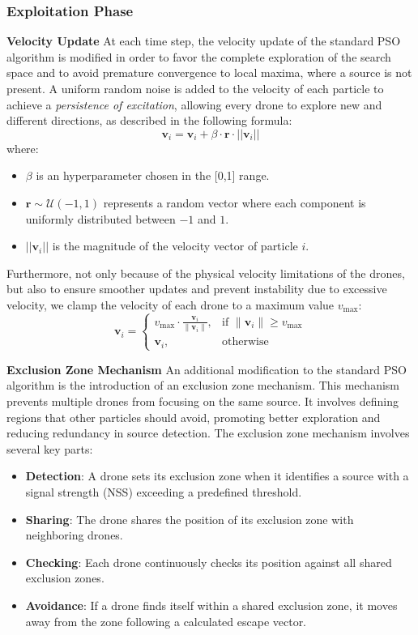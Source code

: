 \subsubsection{Exploitation Phase}
\textbf{Velocity Update}
At each time step, the velocity update of the standard PSO algorithm is modified in order to favor the complete 
exploration of the search space and to avoid premature convergence to local maxima, where a source is not present. 
A uniform random noise is added to the velocity of each particle to achieve a \textit{persistence of excitation},
allowing every drone to explore new and different directions, 
as described in the following formula:
\[
\mathbf{v}_i = \mathbf{v}_i + \beta \cdot \mathbf{r} \cdot ||\mathbf{v}_i||
\] \label{eq:persistence_of_excitation}
where:
\begin{itemize}
    \item \(\beta\) is an hyperparameter chosen in the [0,1] range.
    \item \(\mathbf{r} \sim \mathcal{U}(-1, 1)\) represents a random vector where each component is uniformly distributed between \(-1\) and \(1\).
    \item \(||\mathbf{v}_i||\) is the magnitude of the velocity vector of particle \(i\).
\end{itemize}
Furthermore, not only because of the physical velocity limitations of the drones, but also to ensure smoother updates 
and prevent instability due to excessive velocity, we clamp the velocity of each drone 
to a maximum value \(v_{\text{max}}\):
\[
\mathbf{v}_i = 
\begin{cases} 
v_{\text{max}} \cdot \frac{\mathbf{v}_i}{\|\mathbf{v}_i\|}, & \text{if } \|\mathbf{v}_i\| \geq v_{\text{max}} \\
\mathbf{v}_i, & \text{otherwise}
\end{cases}
\] \label{eq:velocity_clamping3}


\textbf{Exclusion Zone Mechanism}
An additional modification to the standard PSO algorithm 
is the introduction of an exclusion zone mechanism.
This mechanism prevents multiple drones from focusing 
on the same source. It involves defining regions that 
other particles should avoid, promoting better exploration 
and reducing redundancy in source detection. The exclusion 
zone mechanism involves several key parts:
\begin{itemize}
    \item \textbf{Detection}: A drone sets its exclusion zone 
    when it identifies a source with a signal strength (NSS) 
    exceeding a predefined threshold.
    \item \textbf{Sharing}: The drone shares the position of 
    its exclusion zone with neighboring drones.
    \item \textbf{Checking}: Each drone continuously checks 
    its position against all shared exclusion zones.
    \item \textbf{Avoidance}: If a drone finds itself within 
    a shared exclusion zone, it moves away from the zone 
    following a calculated escape vector.
\end{itemize}


